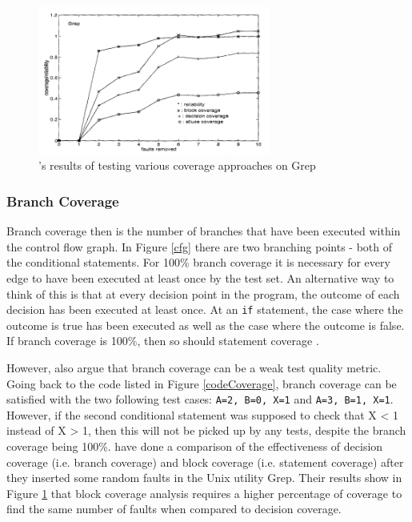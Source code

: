 \begin{figure}
\begin{minipage}{0.49\textwidth}
\centering
\includegraphics[width=3in]{figures/coverage_reliability.png}
\caption{\citet{497650}'s results of testing various coverage approaches on Grep}
\label{coverageReliability}
\end{minipage}
\end{figure}

\subsubsection{Branch Coverage}

Branch coverage then is the number of branches that have been executed within the control flow graph. In Figure \ref{cfg} there are two branching points - both of the conditional statements. For 100\% branch coverage it is necessary for every edge to have been executed at least once by the test set. An alternative way to think of this is that at every decision point in the program, the outcome of each decision has been executed at least once. At an \verb+if+ statement, the case where the outcome is true has been executed as well as the case where the outcome is false. If branch coverage is 100\%, then so should statement coverage \citep{Myers:2004:AST:983238}.

However, \citet{Myers:2004:AST:983238} also argue that branch coverage can be a weak test quality metric. Going back to the code listed in Figure \ref{codeCoverage}, branch coverage can be satisfied with the two following test cases: \verb+A=2, B=0, X=1+ and \verb+A=3, B=1, X=1+. However, if the second conditional statement was supposed to check that X < 1 instead of X > 1, then this will not be picked up by any tests, despite the branch coverage being 100\%. \citet{497650} have done a comparison of the effectiveness of decision coverage (i.e. branch coverage) and block coverage (i.e. statement coverage) after they inserted some random faults in the Unix utility Grep. Their results show in Figure \ref{coverageReliability} that block coverage analysis requires a higher percentage of coverage to find the same number of faults when compared to decision coverage.

